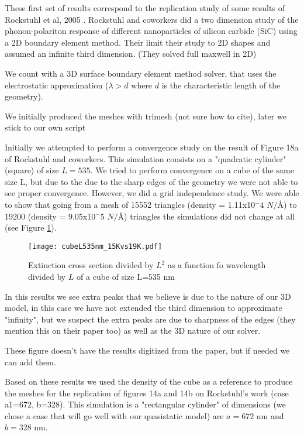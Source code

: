 
These first set of results correspond to the replication study of some results 
of Rockstuhl et al, 2005 \cite{rockstuhl2005}. Rockstuhl and coworkers did a two dimension 
study of the phonon-polariton response of different nanoparticles of silicon carbide (SiC)
using a 2D boundary element method. Their limit their study to 2D shapes and assumed an infinite
third dimension. (They solved full maxwell in 2D)


We count with a 3D surface boundary element method solver, that uses the electrostatic approximation
($\lambda > d$ where $d$ is the characteristic length of the geometry). 

{\color{red}We initially produced the meshes with trimesh (not sure how to cite), later we stick to 
our own script}

Initially we attempted to perform a convergence study on the result of Figure 18a
of Rockstuhl and coworkers. This simulation consists on a "quadratic cylinder" (square)
of size $L=535$. We tried to perform convergence on a cube of the same size L, but
due to the due to the sharp edges of the geometry we were not able to see proper convergence. 
However, we did a grid independence study. We were able to show that going from a mesh of 15552 
triangles (density = 1.11x10$^-4$ $N/\text{\AA}$) to 19200 (density = 9.05x10$^-5$ $N/\text{\AA}$) 
triangles the simulations did not change at all (see Figure \ref{fig:cube535}).  

\begin{figure}
    \centering
    \texttt{[image: cubeL535nm\_15Kvs19K.pdf]} 
    \caption{Extinction cross section divided by $L^2$ as a function fo wavelength divided by $L$ of
    a cube of size L=535 nm}
    \label{fig:cube535}
 \end{figure}

In this results we see extra peaks that we believe is due to the nature of our 3D model, in this case 
we have not extended the third dimension to approximate "infinity", but we suspect the extra peaks are 
due to sharpness of the edges (they mention this on their paper too) as well as the 3D nature of our solver.

These figure doesn't have the results digitized from the paper, but if needed we can add them. 

Based on these results we used the density of the cube as a reference to produce the meshes for the replication 
of figures 14a and 14b on Rockstuhl's work (case a1=672, b=328). This simulation is a "rectangular cylinder" of 
dimensions (we chose a case that will go well with our quasistatic model) are $a=672$ nm and $b=328$ nm. 

